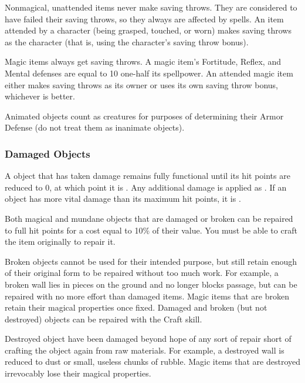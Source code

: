  Nonmagical, unattended items never make saving throws. They are considered to have failed their saving throws, so they always are affected by spells. An item attended by a character (being grasped, touched, or worn) makes saving throws as the character (that is, using the character's saving throw bonus).

\par Magic items always get saving throws. A magic item's Fortitude, Reflex, and Mental defenses are equal to 10 \add one-half its spellpower. An attended magic item either makes saving throws as its owner or uses its own saving throw bonus, whichever is better.

 Animated objects count as creatures for purposes of determining their Armor Defense (do not treat them as inanimate objects).


\subsubsection{Damaged Objects}
    A object that has taken damage remains fully functional until its hit points are reduced to 0, at which point it is .
    Any additional damage is applied as .
    If an object has more vital damage than its maximum hit points, it is .

    Both magical and mundane objects that are damaged or broken can be repaired to full hit points for a cost equal to 10\% of their value.
    You must be able to craft the item originally to repair it.

    \label{Broken Objects}
        Broken objects cannot be used for their intended purpose, but still retain enough of their original form to be repaired without too much work. For example, a broken wall lies in pieces on the ground and no longer blocks passage, but can be repaired with no more effort than damaged items. Magic items that are broken retain their magical properties once fixed. Damaged and broken (but not destroyed) objects can be repaired with the Craft skill.

    \label{Destroyed Objects}
        Destroyed object have been damaged beyond hope of any sort of repair short of crafting the object again from raw materials.
        For example, a destroyed wall is reduced to dust or small, useless chunks of rubble.
        Magic items that are destroyed irrevocably lose their magical properties.

